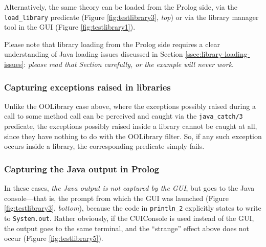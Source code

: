 Alternatively, the same theory can be loaded from the Prolog side, via the \texttt{load\_library} predicate (Figure \ref{fig:testlibrary3}, \textit{top}) or via the library manager tool in the GUI (Figure \ref{fig:testlibrary1}).

Please note that library loading from the Prolog side requires a clear understanding of Java loading issues discussed in Section \ref{ssec:library-loading-issues}: \textit{please read that Section carefully, or the example will never work}.

\subsubsection{Capturing exceptions raised in libraries}

Unlike the OOLibrary case above, where the exceptions possibly raised during a call to some method call can be perceived and caught via the \texttt{java\_catch/3} predicate, the exceptions possibly raised inside a \tuprolog{} library cannot be caught at all, since they have nothing to do with the OOLibrary filter.
So, if any such exception occurs inside a library, the corresponding predicate simply fails.

\subsubsection{Capturing the Java output in Prolog}

In these cases, \textit{the Java output is not captured by the \tuprolog{} GUI}, but goes to the Java console---that is, the prompt from which the GUI was launched (Figure \ref{fig:testlibrary3}, \textit{bottom}), because the code in \texttt{println\_2} explicitly states to write to \texttt{System.out}.
Rather obviously, if the CUIConsole is used instead of the GUI, the output goes to the same terminal, and the ``strange'' effect above does not occur (Figure \ref{fig:testlibrary5}).

